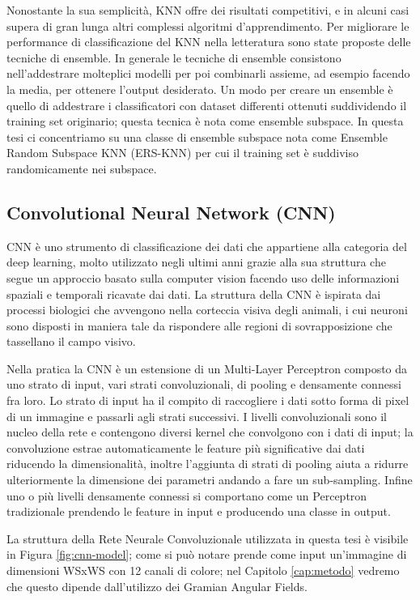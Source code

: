 Nonostante la sua semplicità, KNN offre dei risultati competitivi, e in alcuni casi supera di gran lunga altri complessi algoritmi d'apprendimento. Per migliorare le performance di classificazione del 
KNN nella letteratura sono state proposte delle tecniche di ensemble. In generale le tecniche di ensemble consistono nell'addestrare molteplici modelli per poi combinarli assieme, ad 
esempio facendo la media, per ottenere l'output desiderato. Un modo per creare un ensemble è quello di addestrare i classificatori con dataset differenti ottenuti suddividendo il training set originario; 
questa tecnica è nota come ensemble subspace. In questa tesi ci concentriamo su una classe di ensemble subspace nota come Ensemble Random Subspace KNN (ERS-KNN) per cui il training set è suddiviso 
randomicamente nei subspace.

\subsection{Convolutional Neural Network (CNN)}

CNN è uno strumento di classificazione dei dati che appartiene alla categoria del deep learning, molto utilizzato negli ultimi anni grazie alla sua struttura che segue un approccio basato sulla 
computer vision facendo uso delle informazioni spaziali e temporali ricavate dai dati. La struttura della CNN è ispirata dai processi biologici che avvengono nella corteccia visiva degli animali, 
i cui neuroni sono disposti in maniera tale da rispondere alle regioni di sovrapposizione che tassellano il campo visivo.

Nella pratica la CNN è un estensione di un Multi-Layer Perceptron composto da uno strato di input, vari strati convoluzionali, di pooling e densamente connessi fra loro. Lo strato di input ha il compito 
di raccogliere i dati sotto forma di pixel di un immagine e passarli agli strati successivi. I livelli convoluzionali sono il nucleo della rete e contengono diversi kernel che convolgono con i dati di 
input; la convoluzione estrae automaticamente le feature più significative dai dati riducendo la dimensionalità, inoltre l'aggiunta di strati di pooling aiuta a ridurre ulteriormente la dimensione dei parametri 
andando a fare un sub-sampling. Infine uno o più livelli densamente connessi si comportano come un Perceptron tradizionale prendendo le feature in input e producendo una classe in output.

La struttura della Rete Neurale Convoluzionale utilizzata in questa tesi è visibile in Figura \ref{fig:cnn-model}; come si può notare prende come input un'immagine di dimensioni WSxWS con 12 canali di colore; 
nel Capitolo \ref{cap:metodo} vedremo che questo dipende dall'utilizzo dei Gramian Angular Fields.

